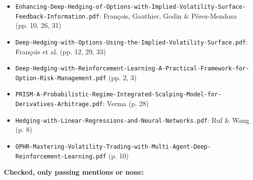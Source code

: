 \documentclass{article}
\begin{document}
\begin{itemize}

\item \texttt{Enhancing-\allowbreak{}Deep-\allowbreak{}Hedging-\allowbreak{}of-\allowbreak{}Options-\allowbreak{}with-\allowbreak{}Implied-\allowbreak{}Volatility-\allowbreak{}Surface-\allowbreak{}Feedback-\allowbreak{}Information.\allowbreak{}pdf}: François, Gauthier, Godin \& Pérez-Mendoza (pp. 10, 26, 31)

\item \texttt{Deep-\allowbreak{}Hedging-\allowbreak{}with-\allowbreak{}Options-\allowbreak{}Using-\allowbreak{}the-\allowbreak{}Implied-\allowbreak{}Volatility-\allowbreak{}Surface.\allowbreak{}pdf}: François et al. (pp. 12, 29, 33)

\item \texttt{Deep-\allowbreak{}Hedging-\allowbreak{}with-\allowbreak{}Reinforcement-\allowbreak{}Learning-\allowbreak{}A-\allowbreak{}Practical-\allowbreak{}Framework-\allowbreak{}for-\allowbreak{}Option-\allowbreak{}Risk-\allowbreak{}Management.\allowbreak{}pdf} (pp. 2, 3)

\item \texttt{PRISM-\allowbreak{}A-\allowbreak{}Probabilistic-\allowbreak{}Regime-\allowbreak{}Integrated-\allowbreak{}Scalping-\allowbreak{}Model-\allowbreak{}for-\allowbreak{}Derivatives-\allowbreak{}Arbitrage.\allowbreak{}pdf}: Verma (p. 28)

\item \texttt{Hedging-\allowbreak{}with-\allowbreak{}Linear-\allowbreak{}Regressions-\allowbreak{}and-\allowbreak{}Neural-\allowbreak{}Networks.\allowbreak{}pdf}: Ruf \& Wang (p. 8)

\item \texttt{OPHR-\allowbreak{}Mastering-\allowbreak{}Volatility-\allowbreak{}Trading-\allowbreak{}with-\allowbreak{}Multi-\allowbreak{}Agent-\allowbreak{}Deep-\allowbreak{}Reinforcement-\allowbreak{}Learning.\allowbreak{}pdf} (p. 10)

\end{itemize}

\textbf{Checked, only passing mentions or none:}
\end{document}
